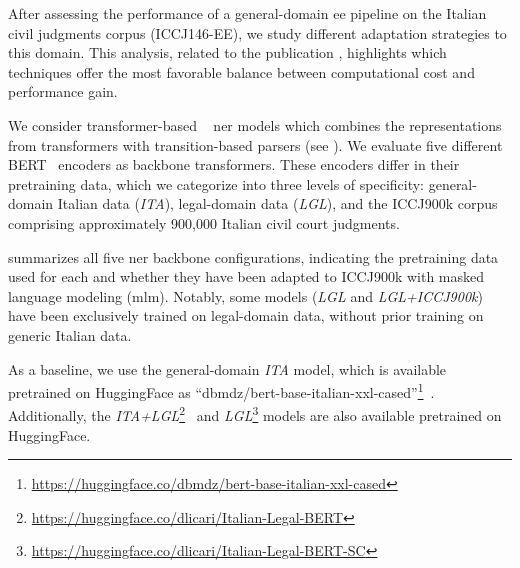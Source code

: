 




After assessing the performance of a general-domain \ac{ee} pipeline on the Italian civil judgments corpus (ICCJ146-EE), we study different adaptation strategies to this domain. This analysis, related to the \phd publication \textcite{aixia_2023}, highlights which techniques offer the most favorable balance between computational cost and performance gain.

We consider transformer-based \spacy~\cite{honnibal2020spacy} \ac{ner} models which combines the representations from transformers with transition-based parsers (see ). We evaluate five different BERT~\cite{devlin-etal-2019-bert} encoders as backbone transformers. These encoders differ in their pretraining data, which we categorize into three levels of specificity: general-domain Italian data (\textit{ITA}), legal-domain data (\textit{LGL}), and the ICCJ900k corpus comprising approximately 900,000 Italian civil court judgments.

 summarizes all five \ac{ner} backbone configurations, indicating the pretraining data used for each and whether they have been adapted to ICCJ900k with masked language modeling (\acs{mlm}). Notably, some models (\textit{LGL} and \textit{LGL+ICCJ900k}) have been exclusively trained on legal-domain data, without prior training on generic Italian data.



As a baseline, we use the general-domain \textit{ITA} model, which is available pretrained on HuggingFace as ``dbmdz/bert-base-italian-xxl-cased''\footnote{\url{https://huggingface.co/dbmdz/bert-base-italian-xxl-cased}}~\cite{stefan_schweter_2020_4263142}. Additionally, the \textit{ITA+LGL}\footnote{\url{https://huggingface.co/dlicari/Italian-Legal-BERT}}~\cite{licari_italian-legal-bert_2022} and \textit{LGL}\footnote{\url{https://huggingface.co/dlicari/Italian-Legal-BERT-SC}} models are also available pretrained on HuggingFace.

